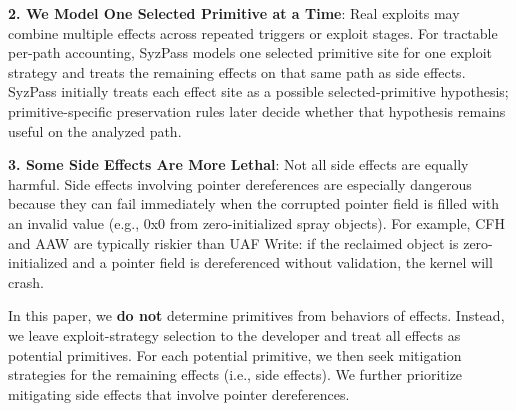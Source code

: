 \noindent\textbf{2. We Model One Selected Primitive at a Time}: 
Real exploits may combine multiple effects across repeated triggers or exploit stages. For tractable per-path accounting, SyzPass models one selected primitive site for one exploit strategy and treats the remaining effects on that same path as side effects. SyzPass initially treats each effect site as a possible selected-primitive hypothesis; primitive-specific preservation rules later decide whether that hypothesis remains useful on the analyzed path.

\noindent\textbf{3. Some Side Effects Are More Lethal}: 
Not all side effects are equally harmful. Side effects involving pointer dereferences are especially dangerous because they can fail immediately when the corrupted pointer field is filled with an invalid value (e.g., 0x0 from zero-initialized spray objects). For example, CFH and AAW are typically riskier than UAF Write: if the reclaimed object is zero-initialized and a pointer field is dereferenced without validation, the kernel will crash.




In this paper, we \textbf{do not} determine primitives from behaviors of effects. Instead, we leave exploit-strategy selection to the developer and treat all effects as potential primitives. For each potential primitive, we then seek mitigation strategies for the remaining effects (i.e., side effects). We further prioritize mitigating side effects that involve pointer dereferences.




